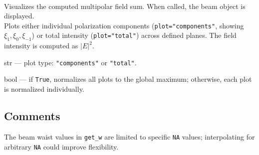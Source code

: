 \begin{description}[leftmargin=4cm]
    \item[\texttt{plot\_beam(plot="components", globalnorm=False)}] \hfill \\
    Visualizes the computed multipolar field sum. When called, the beam object is displayed.\\
    Plots either individual polarization components (\texttt{plot="components"}, showing \( \xi_1, \xi_0, \xi_{-1} \)) or total intensity (\texttt{plot="total"}) across defined planes. The field intensity is computed as \( |E|^2 \).
    \begin{description}[leftmargin=1cm]
        \item[\texttt{plot:}] str — plot type: \texttt{"components"} or \texttt{"total"}.
        \item[\texttt{globalnorm:}] bool — if \texttt{True}, normalizes all plots to the global maximum; otherwise, each plot is normalized individually.
    \end{description}
\end{description}

\subsection{Comments}
The beam waist values in \texttt{get\_w} are limited to specific \texttt{NA} values; interpolating for arbitrary \texttt{NA} could improve flexibility. 

